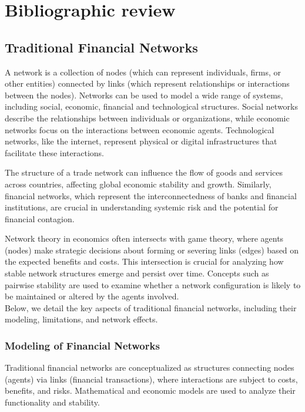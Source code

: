 
\chapter{Bibliographic review}
\section{Traditional Financial Networks}
A network is a collection of nodes (which can represent individuals, firms, or other entities) connected by links (which represent relationships or interactions between the nodes). Networks can be used to model a wide range of systems, including social, economic, financial and technological structures. Social networks describe the relationships between individuals or organizations, while economic networks focus on the interactions between economic agents. Technological networks, like the internet, represent physical or digital infrastructures that facilitate these interactions. \cite{bich_existence_2020}

The structure of a trade network can influence the flow of goods and services across countries, affecting global economic stability and growth. Similarly, financial networks, which represent the interconnectedness of banks and financial institutions, are crucial in understanding systemic risk and the potential for financial contagion.


Network theory in economics often intersects with game theory, where agents (nodes) make strategic decisions about forming or severing links (edges) based on the expected benefits and costs. This intersection is crucial for analyzing how stable network structures emerge and persist over time. Concepts such as pairwise stability are used to examine whether a network configuration is likely to be maintained or altered by the agents involved. \cite{bich_perfect_2023} \\

Below, we detail the key aspects of traditional financial networks, including their modeling, limitations, and network effects.

\subsection{Modeling of Financial Networks}

Traditional financial networks are conceptualized as structures connecting nodes (agents) via links (financial transactions), where interactions are subject to costs, benefits, and risks. Mathematical and economic models are used to analyze their functionality and stability.

